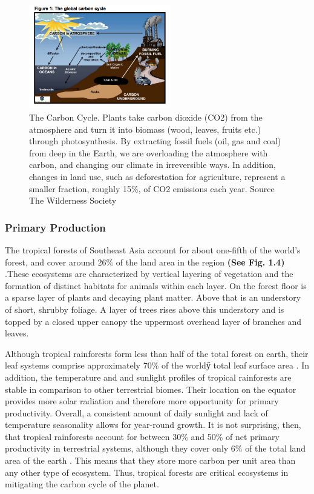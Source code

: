     \begin{figure}[ht]
    \centering
        \includegraphics[width = 0.55\textwidth]{graphics/carboncycle.png}
        \caption{The Carbon Cycle. Plants take carbon dioxide (CO2) from the atmosphere and turn it into biomass (wood, leaves, fruits etc.) through photosynthesis. By extracting fossil fuels (oil, gas and coal) from deep in the Earth, we are overloading the atmosphere with carbon, and changing our climate in irreversible ways. In addition, changes in land use, such as deforestation for agriculture, represent a smaller fraction, roughly 15\%, of CO2 emissions each year. Source The Wilderness Society}
    \end{figure}


\subsubsection{Primary Production}


  
  
  
  The tropical forests of Southeast Asia account for about one-fifth of the world's forest, and cover around 26\% of the land area in the region \textbf{(See Fig. 1.4)} \citep{brown2003state}.These ecosystems are characterized by vertical layering of vegetation and the formation of distinct habitats for animals within each layer. On the forest floor is a sparse layer of plants and decaying plant matter. Above that is an understory of short, shrubby foliage. A layer of trees rises above this understory and is topped by a closed upper canopy the uppermost overhead layer of branches and leaves.
  
  Although tropical rainforests form less than half of the total forest on earth, their leaf systems comprise approximately 70\% of the worldӳ total leaf surface area \citep{gower1999direct}. In addition, the temperature and and sunlight profiles of tropical rainforests are stable in comparison to other terrestrial biomes. Their location on the equator provides more solar radiation and therefore more opportunity for primary productivity. Overall, a consistent amount of daily sunlight and lack of temperature seasonality allows for year-round growth.   It is not surprising, then, that tropical rainforests account for between 30\% and 50\% of net primary productivity in terrestrial systems, although they cover only 6\% of the total land area of the earth \citep{houghton2005aboveground}. This means that they store more carbon per unit area than any other type of ecosystem. Thus, tropical forests are critical ecosystems in mitigating the carbon cycle of the planet. 
  
